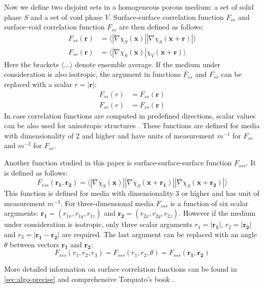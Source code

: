 \documentclass[reprint,amsmath,amssymb,aps,pre,showkeys,showpacs]{revtex4-1}
\begin{document}
Now we define two disjoint sets in a homogeneous porous medium: a set of solid
phase $S$ and a set of void phase $V$. Surface-surface correlation function
$F_{ss}$ and surface-void correlation function $F_{sv}$ are then defined as follows:
\begin{align}
  F_{ss}(\bm{r}) &= \langle |\nabla \chi_S(\bm{x})| |\nabla \chi_S(\bm{x} +
  \bm{r})| \rangle \label{eq:fss} \\
  F_{sv}(\bm{r}) &= \langle |\nabla \chi_S(\bm{x})| \chi_V(\bm{x} +
  \bm{r}) \rangle \label{eq:fsv}
\end{align}
Here the brackets $\langle \dots \rangle$ denote ensemble average. If the medium
under consideration is also isotropic, the argument in functions $F_{ss}$ and
$F_{sv}$ can be replaced with a scalar $r = |\bm{r}|$:
\begin{align*}
  F_{ss}(r) &= F_{ss}(\bm{r}) \\
  F_{sv}(r) &= F_{sv}(\bm{r})
\end{align*}
In case correlation functions are computed in predefined directions, scalar
values can be also used for anisotropic structures
\cite{jiao2014chawla,EPL1}. These functions are defined for media with
dimensionality of 2 and higher and have units of measurement $m^{-1}$ for
$F_{sv}$ and $m^{-2}$ for $F_{ss}$.

Another function studied in this paper is surface-surface-surface function
$F_{sss}$. It is defined as follows:
\begin{equation}
  F_{sss}(\bm{r_1}, \bm{r_2}) = \langle |\nabla \chi_S(\bm{x})|
  |\nabla \chi_S(\bm{x} + \bm{r_1})|
  |\nabla \chi_S(\bm{x} + \bm{r_2})|
  \rangle \label{eq:fsss}
\end{equation}
This function is defined for media with dimensionality 3 or higher and has unit
of measurement $m^{-3}$. For three-dimensional media $F_{sss}$ is a function of
six scalar arguments: $\bm{r_1} = (r_{1x}, r_{1y}, r_{1z})$ and
$\bm{r_2} = (r_{2x}, r_{2y}, r_{2z})$. However if the medium under consideration
is isotropic, only three scalar arguments $r_1 = |\bm{r_1}|$, $r_2 = |\bm{r_2}|$
and $r_3 = |\bm{r_1} - \bm{r_2}|$ are required. The last argument can be
replaced with an angle $\theta$ between vectors $\bm{r_1}$ and $\bm{r_2}$:
\begin{equation*}
  F_{sss}(r_1, r_2, r_3) = F_{sss}(r_1, r_2, \theta) = F_{sss}(\bm{r_1}, \bm{r_2})
\end{equation*}


More detailed information on surface correlation functions can be found in
\cref{sec:algo-precise} and comprehensive Torquato's book \cite{Torquato_book}.
\end{document}
